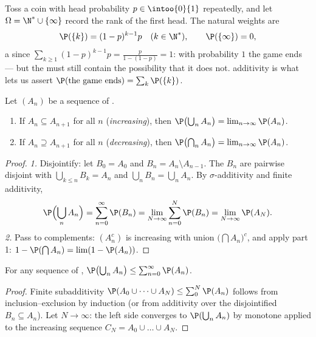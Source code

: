 \begin{example}\label{ex:b2:proba:geometric}
Toss a coin with head probability $p \in \intoo{0}{1}$ repeatedly,
and let $\Omega = \N^* \cup \{\infty\}$ record the rank of the
first head. The natural weights are
\[
\P(\{k\}) = (1 - p)^{k-1}p
\quad (k \in \N^*),
\qquad
\P(\{\infty\}) = 0 ,
\]
a  since $\sum_{k\geq1}(1-p)^{k-1}p =
\frac{p}{1 - (1-p)} = 1$: with probability $1$ the game ends ---
but the  must still contain the possibility that it
does not.  additivity is what lets us assert
$\P(\text{the game ends}) = \sum_k \P(\{k\})$.
\end{example}

\begin{theorem}\label{thm:b2:proba:continuity}
Let $(A_n)$ be a sequence of .
\begin{enumerate}
\item If $A_n \subseteq A_{n+1}$ for all $n$
(\emph{increasing}), then
$\P\bigl(\bigcup_n A_n\bigr) = \lim_{n\to\infty} \P(A_n)$.
\item If $A_n \supseteq A_{n+1}$ for all $n$
(\emph{decreasing}), then
$\P\bigl(\bigcap_n A_n\bigr) = \lim_{n\to\infty} \P(A_n)$.
\end{enumerate}
\end{theorem}

\begin{proof}
\emph{1.} Disjointify: let $B_0 = A_0$ and $B_n = A_n \setminus
A_{n-1}$. The $B_n$ are pairwise disjoint with $\bigcup_{k \leq n}
B_k = A_n$ and $\bigcup_n B_n = \bigcup_n A_n$. By
$\sigma$-additivity and finite additivity,
\[
\P\Bigl(\bigcup_n A_n\Bigr)
= \sum_{n=0}^\infty \P(B_n)
= \lim_{N\to\infty}\sum_{n=0}^N \P(B_n)
= \lim_{N\to\infty}\P(A_N) .
\]
\emph{2.} Pass to complements: $(A_n^c)$ is increasing with union
$\bigl(\bigcap A_n\bigr)^c$, and apply part 1:
$1 - \P(\bigcap A_n) = \lim (1 - \P(A_n))$.
\end{proof}

\begin{corollary}\label{cor:b2:proba:subadd}
For any sequence of , $\P\bigl(\bigcup_n A_n\bigr) \leq
\sum_{n=0}^\infty \P(A_n)$.
\end{corollary}

\begin{proof}
Finite subadditivity $\P(A_0 \cup \dots \cup A_N) \leq
\sum_0^N \P(A_n)$ follows from inclusion--exclusion by induction
(or from additivity over the disjointified $B_n \subseteq A_n$).
Let $N \to \infty$: the left side converges to
$\P(\bigcup_n A_n)$ by monotone  applied to the
increasing sequence $C_N = A_0 \cup \dots \cup A_N$.
\end{proof}

